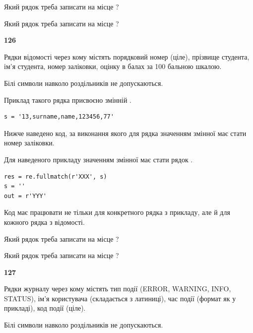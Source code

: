 Який рядок треба записати на місце  ?\par
\vspace{5mm}


Який рядок треба записати на місце  ?\par


\newpage

{\begin {center}\textbf{ 126}\end {center}}\par
Рядки відомості через кому містять порядковий номер (ціле), пріз\-ви\-ще студен\-та, ім'я студента, номер заліковки, оцінку в балах за 100 бальною шкалою.

Білі символи навколо роздільників не допускаються.

Приклад такого рядка присвоєно змінній .



\begin{verbatim}
s = '13,surname,name,123456,77'
\end{verbatim}


Нижче наведено код, за виконання якого для рядка  значенням змінної  має стати номер заліковки.

Для наведеного прикладу значенням змінної  має стати рядок  .



\begin{verbatim}
res = re.fullmatch(r'XXX', s)
s = ''
out = r'YYY'
\end{verbatim}


Код має працювати не тільки для конкретного рядка з прикладу, але й для кожного рядка з відомості.




Який рядок треба записати на місце  ?\par
\vspace{5mm}


Який рядок треба записати на місце  ?\par


\newpage

{\begin {center}\textbf{ 127}\end {center}}\par
Рядки журналу через кому містять тип події (ERROR, WARNING, INFO, STATUS), ім'я користувача (складається з латиниці), час події (фор\-мат як у прикладі), код події (ціле).

Білі символи навколо роздільників не допускаються.

